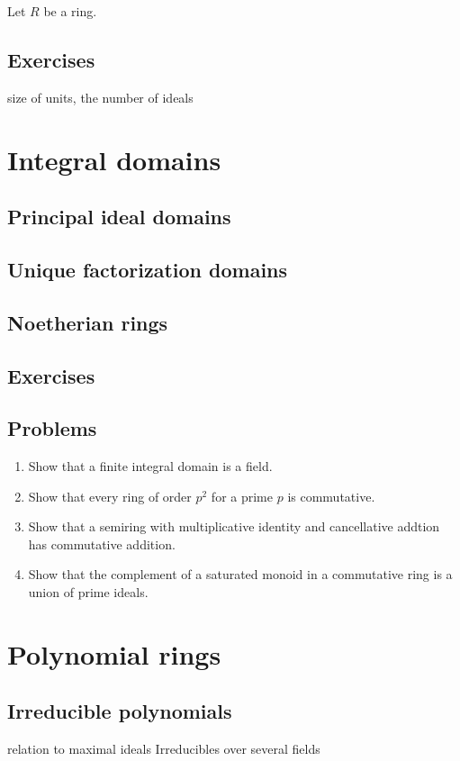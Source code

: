 \documentclass{../../large}
\begin{document}
\begin{prb}
Let $R$ be a ring.
\end{prb}


\section*{Exercises}
size of units, the number of ideals




\chapter{Integral domains}
\section{Principal ideal domains}
\section{Unique factorization domains}
\section{Noetherian rings}

\section*{Exercises}
\section*{Problems}
\begin{enumerate}
\item Show that a finite integral domain is a field.
\item Show that every ring of order $p^2$ for a prime $p$ is commutative.
\item Show that a semiring with multiplicative identity and cancellative addtion has commutative addition.
\item Show that the complement of a saturated monoid in a commutative ring is a union of prime ideals.
\end{enumerate}


\chapter{Polynomial rings}
\section{Irreducible polynomials}
relation to maximal ideals
Irreducibles over several fields
\begin{prb}
\end{prb}
\begin{prb}
\end{prb}
\end{document}
